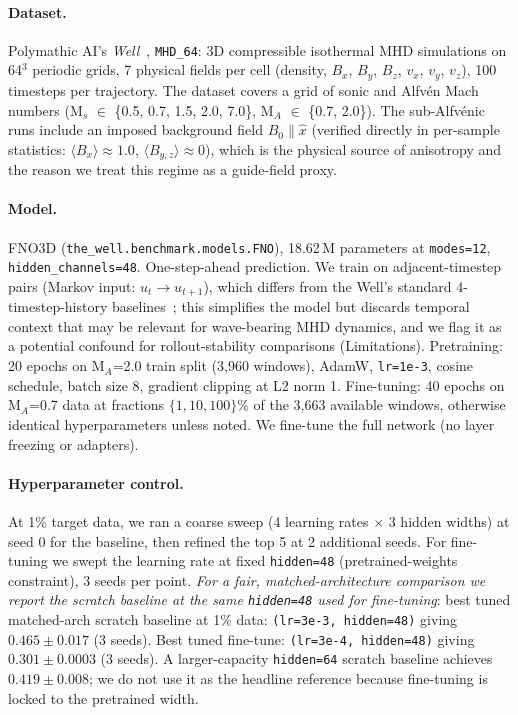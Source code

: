 \documentclass{article}
\begin{document}
\paragraph{Dataset.} Polymathic AI's \emph{Well}~\cite{ohana2024well}, \texttt{MHD\_64}: 3D compressible isothermal MHD simulations on 64$^3$ periodic grids, 7 physical fields per cell (density, $B_x$, $B_y$, $B_z$, $v_x$, $v_y$, $v_z$), 100 timesteps per trajectory. The dataset covers a grid of sonic and Alfv\'en Mach numbers (M$_s$ $\in$ \{0.5, 0.7, 1.5, 2.0, 7.0\}, M$_A$ $\in$ \{0.7, 2.0\}). The sub-Alfv\'enic runs include an imposed background field $B_0 \| \hat{x}$ (verified directly in per-sample statistics: $\langle B_x \rangle \approx 1.0$, $\langle B_{y,z} \rangle \approx 0$), which is the physical source of anisotropy and the reason we treat this regime as a guide-field proxy.

\paragraph{Model.} FNO3D (\texttt{the\_well.benchmark.models.FNO}), 18.62\,M parameters at \texttt{modes=12}, \texttt{hidden\_channels=48}. One-step-ahead prediction. We train on adjacent-timestep pairs (Markov input: $u_t \to u_{t+1}$), which differs from the Well's standard 4-timestep-history baselines~\cite{ohana2024well}; this simplifies the model but discards temporal context that may be relevant for wave-bearing MHD dynamics, and we flag it as a potential confound for rollout-stability comparisons (Limitations). Pretraining: 20 epochs on M$_A$=2.0 train split (3,960 windows), AdamW, \texttt{lr=1e-3}, cosine schedule, batch size 8, gradient clipping at L2 norm 1. Fine-tuning: 40 epochs on M$_A$=0.7 data at fractions $\{1, 10, 100\}\%$ of the 3,663 available windows, otherwise identical hyperparameters unless noted. We fine-tune the full network (no layer freezing or adapters).

\paragraph{Hyperparameter control.} At 1\% target data, we ran a coarse sweep (4 learning rates $\times$ 3 hidden widths) at seed 0 for the baseline, then refined the top 5 at 2 additional seeds. For fine-tuning we swept the learning rate at fixed \texttt{hidden=48} (pretrained-weights constraint), 3 seeds per point. \emph{For a fair, matched-architecture comparison we report the scratch baseline at the same \texttt{hidden=48} used for fine-tuning}: best tuned matched-arch scratch baseline at 1\% data: \texttt{(lr=3e-3, hidden=48)} giving $0.465 \pm 0.017$ (3 seeds). Best tuned fine-tune: \texttt{(lr=3e-4, hidden=48)} giving $0.301 \pm 0.0003$ (3 seeds). A larger-capacity \texttt{hidden=64} scratch baseline achieves $0.419 \pm 0.008$; we do not use it as the headline reference because fine-tuning is locked to the pretrained width.
\end{document}
